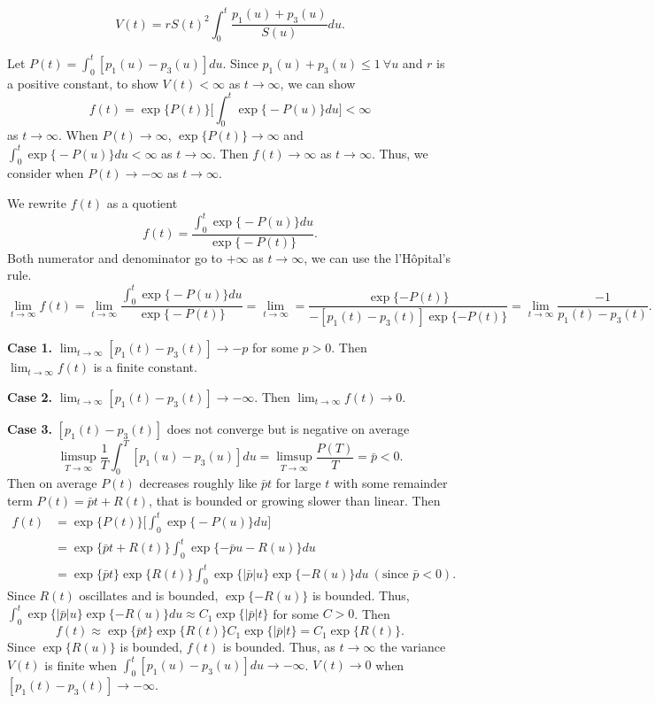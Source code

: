 \documentclass[11pt]{article}
\begin{document}
$$V(t) = r S(t)^2 \int_0^t \frac{p_1(u) + p_3(u)}{S(u)} du.$$

Let $P(t) = \int_0^t [p_1(u) -p_3(u)] du$. Since $p_1(u) + p_3(u) \leq 1 \ \forall u$ and $r$ is a positive constant, to show $V(t) < \infty$ as $t \rightarrow \infty$, we can show 
$$f (t) = \exp \Big\{ P(t) \Big\} \Big[\int_0^t\exp \Big\{ - P(u)  \Big\}du \Big] < \infty $$ as $t \rightarrow \infty$. 
When $P(t) \rightarrow \infty$, $\exp \Big\{  P(t) \Big\} \rightarrow \infty$ and $\int_0^t\exp \Big\{ - P(u)  \Big\}du < \infty$ as $t \rightarrow \infty$. Then $f(t) \rightarrow \infty$ as $t\rightarrow \infty$. Thus, we consider when $P(t) \rightarrow - \infty$ as $t \rightarrow \infty$.

We rewrite $f(t)$ as a quotient
$$f(t) = \frac{\int_0^t\exp \Big\{ - P(u)  \Big\}du }{\exp \Big\{ - P(t) \Big\}}.$$
Both numerator and denominator go to $+ \infty$ as $t \rightarrow \infty$, we can use the l'H\^opital's rule.
$$\lim_{t\rightarrow \infty} f(t) = \lim_{t\rightarrow \infty} \frac{\int_0^t\exp \Big\{ - P(u)  \Big\}du}{\exp \Big\{ - P(t) \Big\}} = \lim_{t\rightarrow \infty} = \frac{\exp \{ - P(t) \}} {-[p_1(t) - p_3(t)] \exp \{ - P(t) \}} =  \lim_{t\rightarrow \infty} \frac{-1}{p_1(t) - p_3(t)}.$$

\textbf{Case 1.} $\lim_{t\rightarrow \infty} [p_1(t) - p_3(t)] \rightarrow - p$ for some $p > 0$. Then $\lim_{t\rightarrow \infty} f(t)$ is a finite constant.

\textbf{Case 2.} $\lim_{t\rightarrow \infty} [p_1(t) - p_3(t)] \rightarrow - \infty$. Then $\lim_{t\rightarrow \infty} f(t) \rightarrow 0$.

\textbf{Case 3.} $[p_1(t) - p_3(t)]$ does not converge but is negative on average $$\limsup_{T\rightarrow\infty} {\frac{1}{T} \int_0^T [p_1(u) - p_3(u)] du = \limsup_{T\rightarrow\infty} \frac{P(T)}{T} = \bar{p}} < 0.$$
Then on average $P(t)$ decreases roughly like $\bar{p}t$ for large $t$ with some remainder term $P(t) = \bar{p}t + R(t)$, that is bounded or growing slower than linear. Then
\begin{equation}
    \begin{split}
        f (t) &= \exp \Big\{ P(t) \Big\} \Big[\int_0^t\exp \Big\{ - P(u)  \Big\}du\Big] \\
        & = \exp \{\bar{p}t + R(t)\} \int_0^t \exp \{-\bar{p}u - R(u)\} du \\
        & = \exp \{\bar{p}t\} \exp\{R(t)\} \int_0^t \exp \{\vert\bar{p} \vert u\} \exp \{-R(u)\} du \ (\text{since } \bar{p} < 0). 
    \end{split}
\end{equation}
Since $R(t)$ oscillates and is bounded, $\exp\{-R(u)\}$ is bounded. Thus, $\int_0^t \exp \{\vert\bar{p} \vert u\} \exp \{-R(u)\} du  \approx C_1 \exp \{\vert\bar{p} \vert t\} $ for some $C > 0$. Then
$$f(t) \approx \exp \{\bar{p}t\} \exp\{R(t)\} C_1 \exp \{\vert\bar{p} \vert t\} = C_1 \exp\{R(t)\}.$$
Since $\exp\{R(u)\}$ is bounded, $f(t)$ is bounded. Thus, as $t \rightarrow \infty$ the variance $V(t)$ is finite when $\int_0^t [p_1(u) - p_3(u)]du \rightarrow -\infty$. $V(t) \rightarrow 0$ when $[p_1(t) - p_3(t)] \rightarrow -\infty$. 
\newpage
\end{document}
